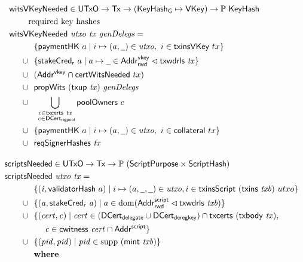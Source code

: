 \begin{figure}[htb]
  \begin{align*}
    & \hspace{-0.8cm}\fun{witsVKeyNeeded} \in \UTxO \to \Tx \to (\KeyHashGen\mapsto\VKey) \to
      \powerset{\KeyHash} \\
    & \text{required key hashes} \\
    &  \hspace{-0.8cm}\fun{witsVKeyNeeded}~\var{utxo}~\var{tx}~\var{genDelegs} = \\
    & ~~\{ \fun{paymentHK}~a \mid i \mapsto (a, \wcard) \in \var{utxo},~i\in\fun{txinsVKey}~{tx} \} \\
    \cup & ~~
           \{\fun{stakeCred_r}~a\mid a\mapsto \wcard \in \AddrRWDVKey
      \restrictdom \txwdrls{tx}\}\\
    \cup & ~~(\AddrVKey \cap \fun{certWitsNeeded}~{tx}) \\
    \cup & ~~\fun{propWits}~(\fun{txup}~\var{tx})~\var{genDelegs} \\
    \cup & ~~\bigcup_{\substack{c \in \txcerts{tx} \\ ~c \in\DCertRegPool}} \fun{poolOwners}~{c} \\
    \cup & ~~\{ \fun{paymentHK}~a \mid i \mapsto (a, \wcard) \in \var{utxo},~i\in\fun{collateral}~{tx} \} \\
    \cup & ~~\fun{reqSignerHashes}~\var{tx}
    \nextdef
    & \hspace{-1cm}\fun{scriptsNeeded} \in \UTxO \to \Tx \to \powerset (\ScriptPurpose \times \ScriptHash) \\
    & \hspace{-1cm}\fun{scriptsNeeded}~\var{utxo}~\var{tx} = \\
    & ~~\{ (\var{i}, \fun{validatorHash}~a) \mid i \mapsto (a, \wcard, \wcard) \in \var{utxo},
      i\in\fun{txinsScript}~{(\fun{txins~\var{txb}})}~{utxo}\} \\
    \cup & ~~\{ (\var{a}, \fun{stakeCred_{r}}~\var{a}) \mid a \in \dom (\AddrRWDScr
           \restrictdom \fun{txwdrls}~\var{txb}) \} \\
    \cup & ~~\{ (\var{cert}, \var{c}) \mid \var{cert} \in (\DCertDeleg \cup \DCertDeRegKey)\cap\fun{txcerts}~(\txbody{tx}), \\
    & ~~~~~~\var{c} \in \cwitness{cert} \cap \AddrScr\} \\
      \cup & ~~\{ (\var{pid}, \var{pid}) \mid \var{pid} \in \supp~(\fun{mint}~\var{txb}) \} \\
    & \where \\

\end{align*}
\end{figure}
